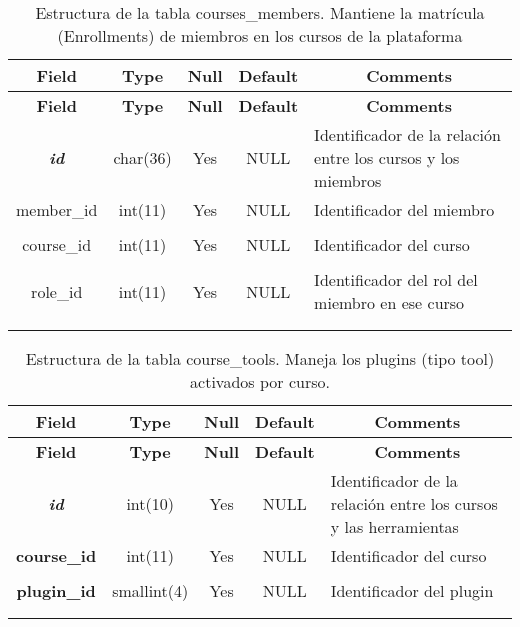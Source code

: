 %
%
\begin{longtable}{c c c c l}
	\multicolumn{1}{c}{\textbf{Field}} &
	\multicolumn{1}{c}{\textbf{Type}} &
	\multicolumn{1}{c}{\textbf{Null}} &
	\multicolumn{1}{c}{\textbf{Default}} &
	\multicolumn{1}{c}{\textbf{Comments}} \\ \hline \hline
\endfirsthead
	\multicolumn{1}{c}{\textbf{Field}} &
	\multicolumn{1}{c}{\textbf{Type}} &
	\multicolumn{1}{c}{\textbf{Null}} &
	\multicolumn{1}{c}{\textbf{Default}} &
	\multicolumn{1}{c}{\textbf{Comments}} \\ \hline \hline
\endhead \endfoot
	\textbf{\textit{id}} & char(36) & Yes & NULL & \parbox[t]{0.35\textwidth}{Identificador de la relación entre los cursos y los miembros}\\ \hline 
	member\_id & int(11) & Yes & NULL & \parbox[t]{0.35\textwidth}{Identificador del miembro} \\ \\  \hline
	course\_id & int(11) & Yes & NULL & \parbox[t]{0.35\textwidth}{Identificador del curso} \\ \\  \hline 
	role\_id & int(11) & Yes & NULL & \parbox[t]{0.35\textwidth}{Identificador del rol del miembro en ese curso} \\ \\ 
\caption[Estructura de la tabla members]{Estructura de la tabla courses\_members. Mantiene la matrícula (Enrollments) de miembros en los cursos de la plataforma} \label{tab:courses_members-structure} \\
\end{longtable}

%
%
\begin{longtable}{c c c c l}
	\multicolumn{1}{c}{\textbf{Field}} &
	\multicolumn{1}{c}{\textbf{Type}} &
	\multicolumn{1}{c}{\textbf{Null}} &
	\multicolumn{1}{c}{\textbf{Default}} &
	\multicolumn{1}{c}{\textbf{Comments}} \\ \hline \hline
\endfirsthead
	\multicolumn{1}{c}{\textbf{Field}} &
	\multicolumn{1}{c}{\textbf{Type}} &
	\multicolumn{1}{c}{\textbf{Null}} &
	\multicolumn{1}{c}{\textbf{Default}} &
	\multicolumn{1}{c}{\textbf{Comments}} \\ \hline \hline
\endhead \endfoot
	\textbf{\textit{id}} & int(10) & Yes & NULL & \parbox[t]{0.35\textwidth}{Identificador de la relación entre los cursos y las herramientas} \\ \hline 
	\textbf{course\_id} & int(11) & Yes & NULL & \parbox[t]{0.35\textwidth}{Identificador del curso} \\ \\  \hline
	\textbf{plugin\_id} & smallint(4) & Yes & NULL & \parbox[t]{0.35\textwidth}{Identificador del plugin} \\ \\ 
\caption[Estructura de la tabla course\_tools]{Estructura de la tabla course\_tools. Maneja los plugins (tipo tool) activados por curso.} \label{tab:course_tools-structure} \\
\end{longtable}

